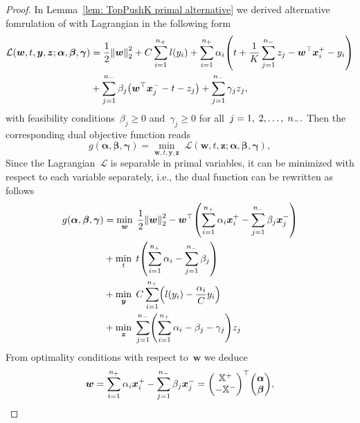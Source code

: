 \begin{proof}
  In Lemma~\ref{lem: TopPushK primal alternative} we derived alternative fomrulation of \TopPushK with Lagrangian in the following form
  \begin{align*}
    \mathcal{L}(\bm{w}, t, \bm{y}, \bm{z}; \bm{\alpha}, \bm{\beta}, \bm{\gamma})
     & = \frac{1}{2} \norm{\bm{w}}_{2}^{2}
       + C \sum_{i = 1}^{\npos} l(y_i)
       + \sum_{i = 1}^{\npos} \alpha_i \Brac{t + \frac{1}{K} \sum_{j = 1}^{\nneg} z_j - \bm{w}^\top \bm{x}^+_i - y_i} \\
     & + \sum_{j = 1}^{\nneg} \beta_j \Brac{\bm{w}^\top \bm{x}^-_j - t - z_j}
       + \sum_{j = 1}^{\nneg} \gamma_j z_j,
  \end{align*}
  with feasibility conditions~$\beta_j \ge 0$ and~$\gamma_j \ge 0$ for all~$j = 1, \; 2, \ldots, \; n_{-}.$ Then the corresponding dual objective function reads
  \begin{equation*}
    g(\bm{\alpha}, \bm{\beta}, \bm{\gamma})
      = \min_{\bm{w}, t, \bm{y}, \bm{z}} \; \mathcal{L}(\bm{w}, t, \bm{z}; \bm{\alpha}, \bm{\beta}, \bm{\gamma}),
  \end{equation*}
  Since the Lagrangian~$\mathcal{L}$ is separable in primal variables, it can be minimized with respect to each variable separately, i.e., the dual function can be rewritten as follows
  \begin{equation}\label{eq: TopPushK dual function}
    \begin{aligned}
      g(\bm{\alpha}, \bm{\beta}, \bm{\gamma})
        & = \min_{\bm{w}} \; \frac{1}{2} \norm{\bm{w}}_{2}^{2}
          - \bm{w}^{\top} \Brac{\sum_{i = 1}^{\npos} \alpha_i \bm{x}^+_i - \sum_{j = 1}^{\nneg} \beta_j \bm{x}^-_j} \\
        & + \min_{t} \; t \Brac{\sum_{i = 1}^{\npos} \alpha_i - \sum_{j = 1}^{\nneg} \beta_j} \\
        & + \min_{\bm{y}} \; C \sum_{i = 1}^{\npos} \Brac{l(y_i) - \frac{\alpha_i}{C}y_i} \\
        & + \min_{\bm{z}} \; \sum_{j = 1}^{\nneg} \Brac{\sum_{i = 1}^{\npos} \alpha_i - \beta_j - \gamma_j}z_j
    \end{aligned}
  \end{equation}
  From optimality conditions with respect to~$\bm{w}$ we deduce 
  \begin{equation*}
    \bm{w}
        = \sum_{i = 1}^{\npos} \alpha_i \bm{x}^+_i - \sum_{j = 1}^{\nneg} \beta_j \bm{x}^-_j
        = \Matrix{\X^+ \\ - \X^-}^\top \vecab,

\end{equation*}
\end{proof}

